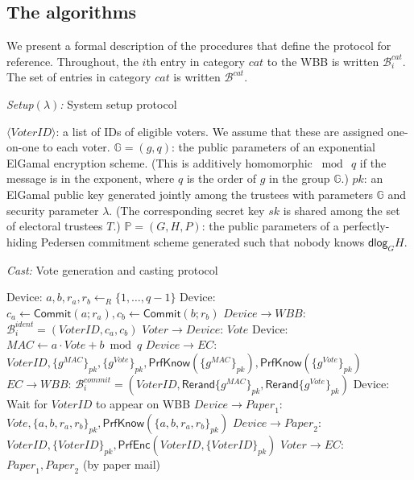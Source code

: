 \documentclass[12pt,a4paper]{article}
\newcommand{\commit}{\mathsf{Commit}}
\newcommand{\PrfEnc}{\mathsf{PrfEnc}}
\newcommand{\PrfKnow}{\mathsf{PrfKnow}}
\newcommand{\rerand}{\mathsf{Rerand}}
\newcommand{\dlog}{\mathsf{dlog}}
\theoremstyle{definition}
\newcommand{\Vote}{\mathit{Vote}}
\newcommand{\VoterID}{\mathit{VoterID}}
\newcommand{\Paper}{\mathit{Paper}}
\newcommand{\Mac}{\mathit{MAC}}
\newcommand{\Wbb}{\mathit{WBB}}
\begin{document}
\subsection{The algorithms}
We present a formal description of the procedures that define the protocol for reference. Throughout, the $i$th entry in category $cat$ to the WBB is written $\mathcal{B}^{cat}_i$. The set of entries in category $cat$ is written $\mathcal{B}^{cat}$.
\singlespacing
\begin{algorithm}
    \caption{\textit{Setup}$(\lambda)$\textit{:} System setup protocol}
	\begin{algorithmic}[1]
        \State $\langle \VoterID \rangle$: a list of IDs of eligible voters.  We assume that these are assigned one-on-one to each voter.
        \State $\mathbb{G} = (g, q)$: the public parameters of an exponential ElGamal encryption scheme.
        (This is additively homomorphic $\bmod\ q$ if the message is in the exponent, where $q$ is the order of $g$ in the group $\mathbb{G}$.)
        \State $pk$: an ElGamal public key generated jointly among the trustees with parameters $\mathbb{G}$ and security parameter $\lambda$. (The corresponding secret key $sk$ is shared among the set of electoral trustees $T$.)
        \State$\mathbb{P} = (G,H,P)$: the public parameters of a perfectly-hiding Pedersen commitment scheme generated such that nobody knows $\dlog_G H$.
    \end{algorithmic}
	\label{alg:setup}
\end{algorithm}
\begin{algorithm}
    \caption{\textit{Cast:} Vote generation and casting protocol}
	\begin{algorithmic}[1]
	\State Device: $a,b,r_a,r_b\leftarrow_R\{1,\ldots,q-1\}$
	\State Device: $c_a\leftarrow\commit(a;r_a), c_b\leftarrow\commit(b;r_b)$
	\State $Device\rightarrow \Wbb$: $\mathcal{B}^{ident}_i=(\VoterID, c_a, c_b)$\label{Step:VoterCommit}
	\State $Voter\rightarrow Device$: $\Vote$
	\State Device: $\Mac\leftarrow a\cdot Vote+b\bmod q$
	\State $Device\rightarrow EC$: $\VoterID, \{g^\Mac\}_{pk}, \{g^\Vote\}_{pk}, \PrfKnow(\{g^\Mac\}_{pk}), \PrfKnow(\{g^\Vote\}_{pk})$%
	\State $EC\rightarrow \Wbb$: $\mathcal{B}^{commit}_i=(\VoterID, \rerand\{g^\Mac\}_{pk}, \rerand\{g^\Vote\}_{pk})$ \label{Step:ECPostsVoteMAC}
	\State Device: Wait for $\VoterID$ to appear on WBB
	\State $Device\rightarrow \Paper_1$: $\Vote, \{a,b,r_a,r_b\}_{pk}, \PrfKnow(\{a,b,r_a,r_b\}_{pk})$
	\State $Device\rightarrow \Paper_2$: $\VoterID, \{\VoterID\}_{pk}, \PrfEnc(\VoterID, \{\VoterID\}_{pk})$
	\State $Voter\rightarrow EC$: $\Paper_1, \Paper_2$ (by paper mail)
	\end{algorithmic}
\label{alg:cast}
\end{algorithm}
\end{document}
